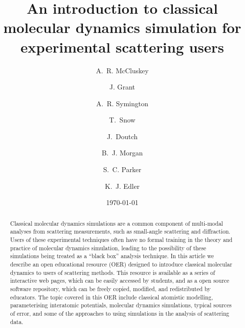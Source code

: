 \documentclass[amsmath,amssymb,twocolumn,superscriptaddress]{revtex4-1}
\begin{document}

\title{An introduction to classical molecular dynamics simulation for experimental scattering users}

\author{A.~R. McCluskey}

\author{J. Grant}

\author{A.~R. Symington}

\author{T.~Snow}

\author{J.~Doutch}

\author{B.~J. Morgan}

\author{S.~C. Parker}

\author{K.~J. Edler}

\date{\today}

\begin{abstract}
\noindent Classical molecular dynamics simulations are a common component of multi-modal analyses from scattering measurements, such as small-angle scattering and diffraction.
Users of these experimental techniques often have no formal training in the theory and practice of molecular dynamics simulation, leading to the possibility of these simulations being treated as a ``black box'' analysis technique.
In this article we describe an open educational resource (OER) designed to introduce classical molecular dynamics to users of scattering methods.
This resource is available as a series of interactive web pages, which can be easily accessed by students, and as a open source software repository, which can be freely copied, modified, and redistributed by educators.
The topic covered in this OER include classical atomistic modelling, parameterising interatomic potentials, molecular dynamics simulations, typical sources of error, and some of the approaches to using simulations in the analysis of scattering data.
\end{abstract}
\end{document}
